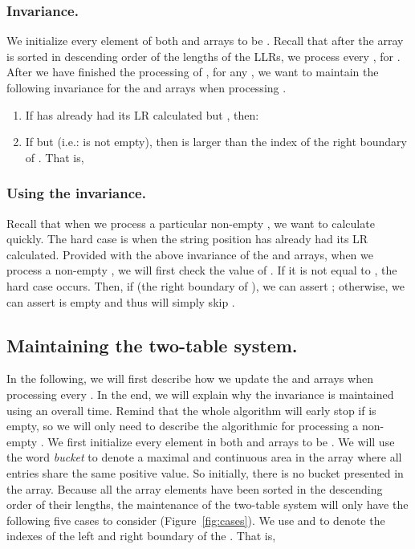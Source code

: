 \documentclass[preprint]{elsarticle}
\begin{document}
\subsubsection{Invariance.}
We initialize every element of both  and  arrays to be .
Recall that after the  array
is sorted in descending order of the lengths of the LLRs, we process
every , for . After we have finished the
processing of , for any , we want to
maintain the following invariance for the  and  arrays when processing .

\begin{enumerate}
\item If  has already had its LR calculated but , then:
  


\item If  but  (i.e.:  is not
  empty), then  is
  larger than the index of the right boundary of . That is,
   
\end{enumerate}


\subsubsection{Using the invariance.}
Recall that when we process a particular non-empty , we want
to calculate  quickly. The hard case is when the string position
 has already had its LR calculated.  Provided with the
above invariance of the  and  arrays, when we process a non-empty , we will first check the
value of . If it is not equal to ,
the hard case occurs. Then, if
 (the right boundary of ), we can assert
; otherwise, we
can assert  is empty and thus will simply skip .



\subsection{Maintaining the two-table system.}
\label{subsec:maintain}
In the following, we will first describe how we update the  and
 arrays when processing every . In the end, we will
explain why the invariance is maintained using an overall  time.
Remind that the whole algorithm will early stop if  is
empty, so we will only need to describe the algorithmic for
processing a non-empty .  We first initialize every element
in both  and  arrays to be .  We will use the word
\emph{bucket} to denote a maximal and continuous area in the 
array where all entries share the same positive value.  So initially,
there is no bucket presented in the  array.  Because all the
 array elements have been sorted in the descending order of
their lengths, the maintenance of the two-table system will only have
the following five cases to consider (Figure~\ref{fig:cases}).  We use
 and  to denote the indexes of the left and right
boundary of the . That is,
\end{document}
